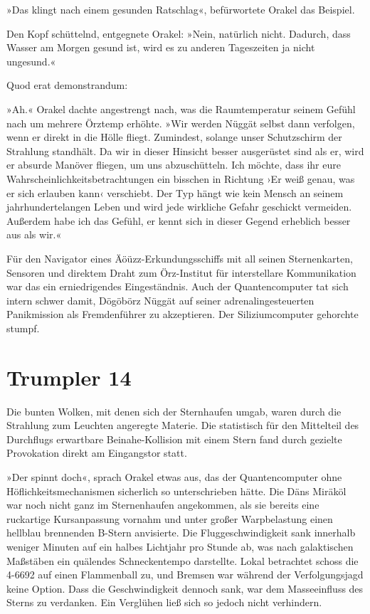 »Das klingt nach einem gesunden Ratschlag«, befürwortete Orakel das Beispiel.


Den Kopf schüttelnd, entgegnete Orakel: »Nein, natürlich nicht. Dadurch, dass Wasser am Morgen gesund ist, wird es zu anderen Tageszeiten ja nicht ungesund.«

Quod erat demonstrandum: 

»Ah.« Orakel dachte angestrengt nach, was die Raumtemperatur seinem Gefühl nach um mehrere Örztemp erhöhte. »Wir werden Nüggät selbst dann verfolgen, wenn er direkt in die Hölle fliegt. Zumindest, solange unser Schutzschirm der Strahlung standhält. Da wir in dieser Hinsicht besser ausgerüstet sind als er, wird er absurde Manöver fliegen, um uns abzuschütteln. Ich möchte, dass ihr eure Wahrscheinlichkeitsbetrachtungen ein bisschen in Richtung ›Er weiß genau, was er sich erlauben kann‹ verschiebt. Der Typ hängt wie kein Mensch an seinem jahrhundertelangen Leben und wird jede wirkliche Gefahr geschickt vermeiden. Außerdem habe ich das Gefühl, er kennt sich in dieser Gegend erheblich besser aus als wir.«

Für den Navigator eines Äöüzz-Erkundungsschiffs mit all seinen Sternenkarten, Sensoren und direktem Draht zum Örz-Institut für interstellare Kommunikation war das ein erniedrigendes Eingeständnis. Auch der Quantencomputer tat sich intern schwer damit, Dögöbörz Nüggät auf seiner adrenalingesteuerten Panikmission als Fremdenführer zu akzeptieren. Der Siliziumcomputer gehorchte stumpf.


\chapter{Trumpler 14}

Die bunten Wolken, mit denen sich der Sternhaufen umgab, waren durch die Strahlung zum Leuchten angeregte Materie. Die statistisch für den Mittelteil des Durchflugs erwartbare Beinahe-Kollision mit einem Stern fand durch gezielte Provokation direkt am Eingangstor statt.

»Der spinnt doch«, sprach Orakel etwas aus, das der Quantencomputer ohne Höflichkeitsmechanismen sicherlich so unterschrieben hätte. Die Däns Miräköl war noch nicht ganz im Sternenhaufen angekommen, als sie bereits eine ruckartige Kursanpassung vornahm und unter großer Warpbelastung einen hellblau brennenden B-Stern anvisierte. Die Fluggeschwindigkeit sank innerhalb weniger Minuten auf ein halbes Lichtjahr pro Stunde ab, was nach galaktischen Maßstäben ein quälendes Schneckentempo darstellte. Lokal betrachtet schoss die 4-6692 auf einen Flammenball zu, und Bremsen war während der Verfolgungsjagd keine Option. Dass die Geschwindigkeit dennoch sank, war dem Masseeinfluss des Sterns zu verdanken. Ein Verglühen ließ sich so jedoch nicht verhindern.

